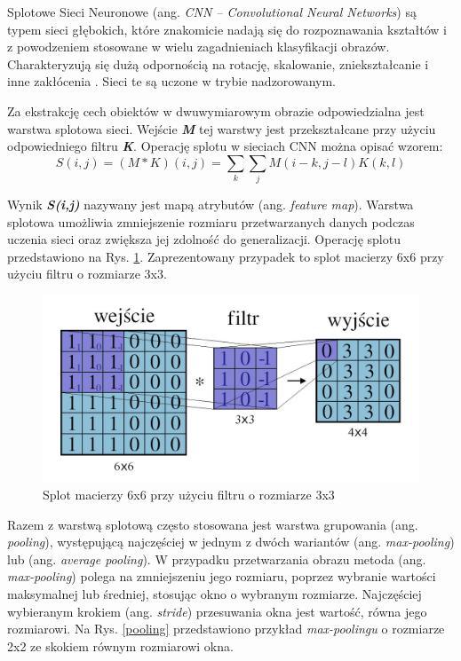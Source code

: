 Splotowe Sieci Neuronowe (ang. \emph{CNN -- Convolutional Neural Networks}) są typem sieci głębokich, które znakomicie nadają się do rozpoznawania kształtów i z powodzeniem stosowane w wielu zagadnieniach klasyfikacji obrazów. Charakteryzują się dużą odpornością na rotację, skalowanie, zniekształcanie i inne zakłócenia \cite{haykin2009neural}. Sieci te są uczone w trybie nadzorowanym. 

Za ekstrakcję cech obiektów w dwuwymiarowym obrazie odpowiedzialna jest warstwa splotowa sieci. Wejście \textbf{\emph{M}} tej warstwy jest przekształcane przy użyciu odpowiedniego filtru \textbf{\emph{K}}. Operację splotu w sieciach CNN można opisać wzorem:
$$
S(i,j) = (M*K)(i,j) =\sum_{k}{\sum_{j}{M(i - k, j - l)K(k, l)}}
$$

Wynik \textbf{\emph{S(i,j)}} nazywany jest mapą atrybutów (ang. \emph{feature map}). Warstwa splotowa umożliwia zmniejszenie rozmiaru przetwarzanych danych podczas uczenia sieci oraz zwiększa jej zdolność do generalizacji. Operację splotu przedstawiono na Rys. \ref{conv}. Zaprezentowany przypadek to splot macierzy 6x6 przy użyciu filtru o rozmiarze 3x3. 


\begin{figure}[!h]
  \centering
  \includegraphics[width=\textwidth]{img/conv.jpg}
  \caption{Splot macierzy 6x6 przy użyciu filtru o rozmiarze 3x3}
  \label{conv}
\end{figure}


Razem z warstwą splotową często stosowana jest warstwa grupowania (ang. \emph{pooling}), występującą najczęściej w jednym z dwóch wariantów (ang. \emph{max-pooling}) lub (ang. \emph{average pooling}). W przypadku przetwarzania obrazu metoda (ang. \emph{max-pooling}) polega na zmniejszeniu jego rozmiaru, poprzez wybranie wartości maksymalnej lub średniej, stosując okno o wybranym rozmiarze. Najczęściej wybieranym krokiem (ang. \emph{stride}) przesuwania okna jest wartość, równa jego rozmiarowi. Na Rys. \ref{pooling} przedstawiono przykład \emph{max-poolingu} o rozmiarze 2x2 ze skokiem równym rozmiarowi okna.

